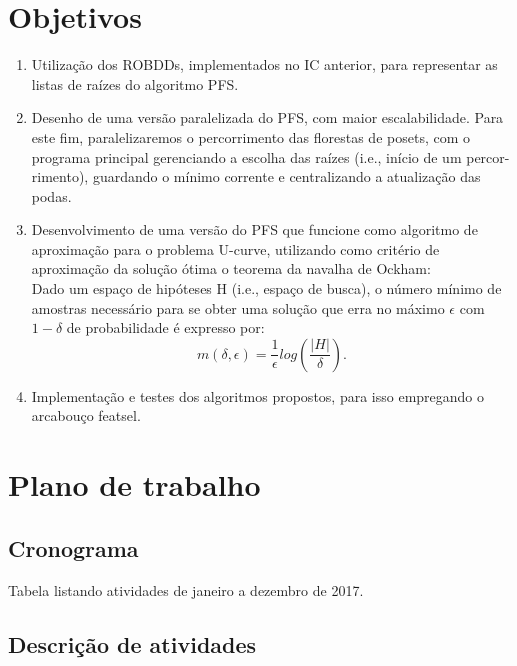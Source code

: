 \documentclass[12pt]{article}
\begin{document}
\section{Objetivos}

\begin{enumerate}
\item Utilização dos ROBDDs, implementados no IC anterior, para representar as 
listas de raízes do algoritmo PFS.

\item Desenho de uma versão paralelizada do PFS, com maior escalabilidade. Para
este fim, paralelizaremos o percorrimento das florestas de posets, com o
programa principal gerenciando a escolha das raízes (i.e., início de um percor-
rimento), guardando o mínimo corrente e centralizando a atualização das podas.

\item Desenvolvimento de uma versão do PFS que funcione como algoritmo de 
aproximação para o problema U-curve, utilizando como critério de aproximação da
solução ótima o teorema da navalha de Ockham:\\
\smallskip
Dado um espaço de hipóteses H (i.e., espaço de busca), o número mínimo de
amostras necessário para se obter uma solução que erra no máximo $\epsilon$ com
$1 - \delta$ de probabilidade é expresso por:
\begin{equation}
\displaystyle  m(\delta,\epsilon) = \frac{1}{\epsilon} log (\frac{|H|}{\delta}).
\end{equation}

\item Implementação e testes dos algoritmos propostos, para isso empregando o 
arcabouço featsel.
\end{enumerate}


\section{Plano de trabalho}

\subsection{Cronograma}

Tabela listando atividades de janeiro a dezembro de 2017.

\subsection{Descrição de atividades}
\end{document}

